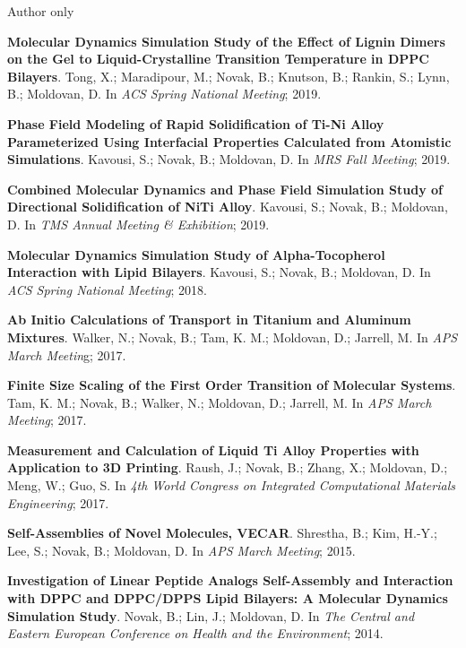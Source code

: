 \begin{cventries}
  \cventry
    {} %
    {Author only} %
    {} %
    {} %
    {
      \begin{cvitems} %
        \item {\textbf{Molecular Dynamics Simulation Study of the Effect of Lignin Dimers on the Gel to Liquid-Crystalline Transition Temperature in DPPC Bilayers}. Tong, X.; Maradipour, M.; Novak, B.; Knutson, B.; Rankin, S.; Lynn, B.; Moldovan, D. In \textit{ACS Spring National Meeting}; 2019.}
        \item {\textbf{Phase Field Modeling of Rapid Solidification of Ti-Ni Alloy Parameterized Using Interfacial Properties Calculated from Atomistic Simulations}. Kavousi, S.; Novak, B.; Moldovan, D. In \textit{MRS Fall Meeting}; 2019.}
        \item {\textbf{Combined Molecular Dynamics and Phase Field Simulation Study of Directional Solidification of NiTi Alloy}. Kavousi, S.; Novak, B.; Moldovan, D. In \textit{TMS Annual Meeting \& Exhibition}; 2019.}
        \item {\textbf{Molecular Dynamics Simulation Study of Alpha-Tocopherol Interaction with Lipid Bilayers}. Kavousi, S.; Novak, B.; Moldovan, D. In \textit{ACS Spring National Meeting}; 2018.}
        \item {\textbf{Ab Initio Calculations of Transport in Titanium and Aluminum Mixtures}. Walker, N.; Novak, B.; Tam, K. M.; Moldovan, D.; Jarrell, M. In \textit{APS March Meetin}g; 2017.}
        \item {\textbf{Finite Size Scaling of the First Order Transition of Molecular Systems}. Tam, K. M.; Novak, B.; Walker, N.; Moldovan, D.; Jarrell, M. In \textit{APS March Meeting}; 2017.}
        \item {\textbf{Measurement and Calculation of Liquid Ti Alloy Properties with Application to 3D Printing}. Raush, J.; Novak, B.; Zhang, X.; Moldovan, D.; Meng, W.; Guo, S. In \textit{4th World Congress on Integrated Computational Materials Engineering}; 2017.}
        \item {\textbf{Self-Assemblies of Novel Molecules, VECAR}. Shrestha, B.; Kim, H.-Y.; Lee, S.; Novak, B.; Moldovan, D. In \textit{APS March Meeting}; 2015.}
        \item {\textbf{Investigation of Linear Peptide Analogs Self-Assembly and Interaction with DPPC and DPPC/DPPS Lipid Bilayers: A Molecular Dynamics Simulation Study}. Novak, B.; Lin, J.; Moldovan, D. In \textit{The Central and Eastern European Conference on Health and the Environment}; 2014.}

\end{cvitems}}
\end{cventries}
